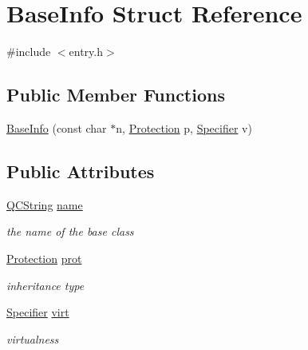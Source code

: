 \hypertarget{struct_base_info}{}\section{Base\+Info Struct Reference}
\label{struct_base_info}


{\ttfamily \#include $<$entry.\+h$>$}

\subsection*{Public Member Functions}
\begin{DoxyCompactItemize}
\item 
\mbox{\hyperlink{struct_base_info_a98a84177d9d88a0520f7db57a13d2a4d}{Base\+Info}} (const char $\ast$n, \mbox{\hyperlink{types_8h_a90e352184df58cd09455fe9996cd4ded}{Protection}} p, \mbox{\hyperlink{types_8h_ab16236bdd10ddf4d73a9847350f0017e}{Specifier}} v)
\end{DoxyCompactItemize}
\subsection*{Public Attributes}
\begin{DoxyCompactItemize}
\item 
\mbox{\label{struct_base_info_ae8bba327d477830b4664f9d03b05c97b}} 
\mbox{\hyperlink{class_q_c_string}{Q\+C\+String}} \mbox{\hyperlink{struct_base_info_ae8bba327d477830b4664f9d03b05c97b}{name}}
\begin{DoxyCompactList}\small\item\em the name of the base class \end{DoxyCompactList}\item 
\mbox{\label{struct_base_info_aaf46efd63ca2b598a79324042bac83f3}} 
\mbox{\hyperlink{types_8h_a90e352184df58cd09455fe9996cd4ded}{Protection}} \mbox{\hyperlink{struct_base_info_aaf46efd63ca2b598a79324042bac83f3}{prot}}
\begin{DoxyCompactList}\small\item\em inheritance type \end{DoxyCompactList}\item 
\mbox{\label{struct_base_info_ab32fa6c3344b6608768043f6ee5a8e6b}} 
\mbox{\hyperlink{types_8h_ab16236bdd10ddf4d73a9847350f0017e}{Specifier}} \mbox{\hyperlink{struct_base_info_ab32fa6c3344b6608768043f6ee5a8e6b}{virt}}
\begin{DoxyCompactList}\small\item\em virtualness \end{DoxyCompactList}\end{DoxyCompactItemize}


